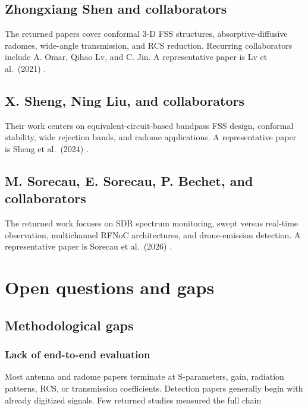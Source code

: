 \documentclass[
  10pt,
]{article}
\begin{document}
\subsection{Zhongxiang Shen and
collaborators}\label{zhongxiang-shen-and-collaborators}

The returned papers cover conformal 3-D FSS structures,
absorptive-diffusive radomes, wide-angle transmission, and RCS
reduction. Recurring collaborators include A. Omar, Qihao Lv, and C.
Jin. A representative paper is Lv et al.~(2021) \citep{lv2021}.

\subsection{X. Sheng, Ning Liu, and
collaborators}\label{x.-sheng-ning-liu-and-collaborators}

Their work centers on equivalent-circuit-based bandpass FSS design,
conformal stability, wide rejection bands, and radome applications. A
representative paper is Sheng et al.~(2024) \citep{sheng2024}.

\subsection{M. Sorecau, E. Sorecau, P. Bechet, and
collaborators}\label{m.-sorecau-e.-sorecau-p.-bechet-and-collaborators}

The returned work focuses on SDR spectrum monitoring, swept versus
real-time observation, multichannel RFNoC architectures, and
drone-emission detection. A representative paper is Sorecau et
al.~(2026) \citep{sorecau2026}.

\section{Open questions and gaps}\label{open-questions-and-gaps}

\subsection{Methodological gaps}\label{methodological-gaps}

\subsubsection{Lack of end-to-end
evaluation}\label{lack-of-end-to-end-evaluation}

Most antenna and radome papers terminate at S-parameters, gain,
radiation patterns, RCS, or transmission coefficients. Detection papers
generally begin with already digitized signals. Few returned studies
measured the full chain
\end{document}
